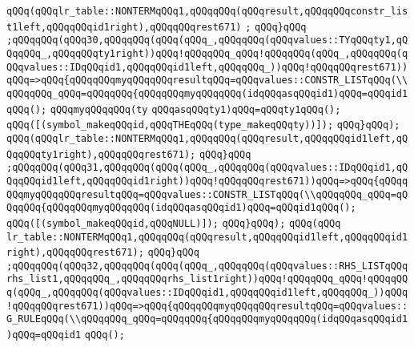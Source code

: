 \verb|qQQq(qQQqlr_table::NONTERMqQQq1,qQQqqQQq(qQQqresult,qQQqqQQqconstr_list1left,qQQqqQQqid1right),qQQqqQQqrest671)|\newline
\verb|;|\newline
\verb|qQQq}qQQq|\newline
\verb|;qQQqqQQq(qQQq30,qQQqqQQq(qQQq(qQQq_,qQQqqQQq(qQQqvalues::TYqQQqty1,qQQqqQQq_,qQQqqQQqty1right))qQQq!qQQqqQQq_qQQq!qQQqqQQq(qQQq_,qQQqqQQq(qQQqvalues::IDqQQqid1,qQQqqQQqid1left,qQQqqQQq_))qQQq!qQQqqQQqrest671))qQQq=>qQQq{qQQqqQQqmyqQQqqQQqresultqQQq=qQQqvalues::CONSTR_LISTqQQq(\\qQQqqQQq_qQQq=qQQqqQQq{qQQqqQQqmyqQQqqQQq(idqQQqasqQQqid1)qQQq=qQQqid1qQQq();|\newline
\verb|qQQqmyqQQqqQQq(ty|\newline
\verb|qQQqasqQQqty1)qQQq=qQQqty1qQQq();|\newline
\verb|qQQq([(symbol_makeqQQqid,qQQqTHEqQQq(type_makeqQQqty))]);|\newline
\verb|qQQq}qQQq);|\newline
\verb|qQQq(qQQqlr_table::NONTERMqQQq1,qQQqqQQq(qQQqresult,qQQqqQQqid1left,qQQqqQQqty1right),qQQqqQQqrest671);|\newline
\verb|qQQq}qQQq|\newline
\verb|;qQQqqQQq(qQQq31,qQQqqQQq(qQQq(qQQq_,qQQqqQQq(qQQqvalues::IDqQQqid1,qQQqqQQqid1left,qQQqqQQqid1right))qQQq!qQQqqQQqrest671))qQQq=>qQQq{qQQqqQQqmyqQQqqQQqresultqQQq=qQQqvalues::CONSTR_LISTqQQq(\\qQQqqQQq_qQQq=qQQqqQQq{qQQqqQQqmyqQQqqQQq(idqQQqasqQQqid1)qQQq=qQQqid1qQQq();|\newline
\verb|qQQq([(symbol_makeqQQqid,qQQqNULL)]);|\newline
\verb|qQQq}qQQq);|\newline
\verb|qQQq(qQQq|\newline
\verb|lr_table::NONTERMqQQq1,qQQqqQQq(qQQqresult,qQQqqQQqid1left,qQQqqQQqid1right),qQQqqQQqrest671);|\newline
\verb|qQQq}qQQq|\newline
\verb|;qQQqqQQq(qQQq32,qQQqqQQq(qQQq(qQQq_,qQQqqQQq(qQQqvalues::RHS_LISTqQQqrhs_list1,qQQqqQQq_,qQQqqQQqrhs_list1right))qQQq!qQQqqQQq_qQQq!qQQqqQQq(qQQq_,qQQqqQQq(qQQqvalues::IDqQQqid1,qQQqqQQqid1left,qQQqqQQq_))qQQq!qQQqqQQqrest671))qQQq=>qQQq{qQQqqQQqmyqQQqqQQqresultqQQq=qQQqvalues::G_RULEqQQq(\\qQQqqQQq_qQQq=qQQqqQQq{qQQqqQQqmyqQQqqQQq(idqQQqasqQQqid1)qQQq=qQQqid1|\newline
\verb|qQQq();|\newline
